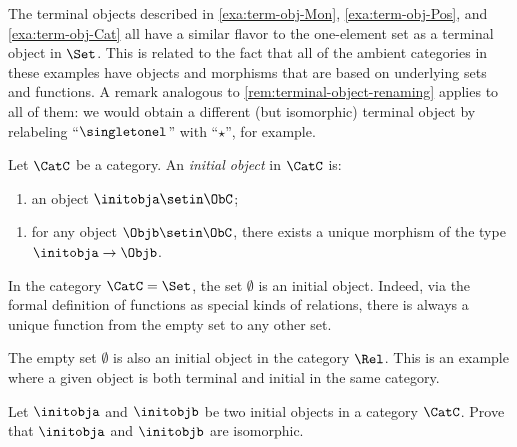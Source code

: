 \begin{remark}
    The terminal objects described in \cref{exa:term-obj-Mon}, \cref{exa:term-obj-Pos}, and \cref{exa:term-obj-Cat} all have a similar flavor to the one-element set as a terminal object in $\Set$.
    This is related to the fact that all of the ambient categories in these examples have objects and morphisms that are based on underlying sets and functions.
    A remark analogous to \cref{rem:terminal-object-renaming} applies to all of them: we would obtain a different (but isomorphic) terminal object by relabeling ``$\singletonel$'' with ``$\star$'', for example.
\end{remark}



\begin{ctdefinition}\label{def:initial-object}
    Let $\CatC$ be a category.
    An \emph{initial object} in $\CatC$ is:

    \constit
    \begin{enumerate}
        \item an object $\initobja \setin \ObC$;
    \end{enumerate}
    \condit
    \begin{enumerate}
        \item for any object $\Objb \setin \ObC$, there exists a unique morphism of the type $\initobja \to \Objb$.
    \end{enumerate}
\end{ctdefinition}

\begin{example}
    In the category $\CatC = \Set$, the set $\emptyset$ is an initial object.
    Indeed, via the formal definition of functions as special kinds of relations, there is always a unique function from the empty set to any other set.
\end{example}

\begin{example}\label{exa:init-obj-Rel}
    The empty set $\emptyset$ is also an initial object in the category $\Rel$.
    This is an example where a given object is both terminal and initial in the same category.
\end{example}


\begin{gradedexercise}
    Let $\initobja$ and $\initobjb$ be two initial objects in a category $\CatC$.
    Prove that $\initobja$ and $\initobjb$ are isomorphic.
\end{gradedexercise}

